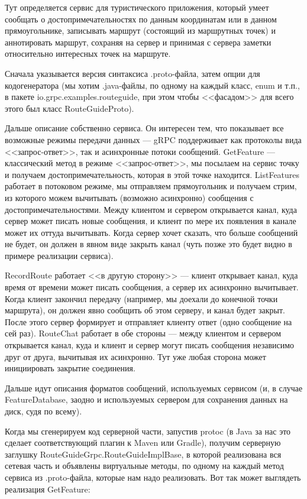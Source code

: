 \documentclass{../../text-style}
\begin{document}
Тут определяется сервис для туристического приложения, который умеет сообщать о достопримечательностях по данным координатам или в данном прямоугольнике, записывать маршрут (состоящий из маршрутных точек) и аннотировать маршрут, сохраняя на сервер и принимая с сервера заметки относительно интересных точек на маршруте. 

Сначала указывается версия синтаксиса .proto-файла, затем опции для кодогенератора (мы хотим .java-файлы, по одному на каждый класс, enum и т.п., в пакете io.grpc.examples.routeguide, при этом чтобы <<фасадом>> для всего этого был класс RouteGuideProto).

Дальше описание собственно сервиса. Он интересен тем, что показывает все возможные режимы передачи данных --- gRPC поддерживает как протоколы вида <<запрос-ответ>>, так и асинхронные потоки сообщений. GetFeature --- классический метод в режиме <<запрос-ответ>>, мы посылаем на сервис точку и получаем достопримечательность, которая в этой точке находится. ListFeatures работает в потоковом режиме, мы отправляем прямоугольник и получаем стрим, из которого можем вычитывать (возможно асинхронно) сообщения с достопримечательностями. Между клиентом и сервером открывается канал, куда сервер может писать новые сообщения, и клиент по мере их появления в канале может их оттуда вычитывать. Когда сервер хочет сказать, что больше сообщений не будет, он должен в явном виде закрыть канал (чуть позже это будет видно в примере реализации сервиса).

RecordRoute работает <<в другую сторону>> --- клиент открывает канал, куда время от времени может писать сообщения, а сервер их асинхронно вычитывает. Когда клиент закончил передачу (например, мы доехали до конечной точки маршрута), он должен явно сообщить об этом серверу, и канал будет закрыт. После этого сервер формирует и отправляет клиенту ответ (одно сообщение на сей раз). RouteChat работает в обе стороны --- между клиентом и сервером открывается канал, куда и клиент и сервер могут писать сообщения независимо друг от друга, вычитывая их асинхронно. Тут уже любая сторона может инициировать закрытие соединения.

Дальше идут описания форматов сообщений, используемых сервисом (и, в случае FeatureDatabase, заодно и используемых сервером для сохранения данных на диск, судя по всему).

Когда мы сгенерируем код серверной части, запустив protoc (в Java за нас это сделает соответствующий плагин к Maven или Gradle), получим серверную заглушку RouteGuideGrpc.RouteGuideImplBase, в которой реализована вся сетевая часть и объявлены виртуальные методы, по одному на каждый метод сервиса из .proto-файла, которые нам надо реализовать. Вот так может выглядеть реализация GetFeature:
\end{document}
